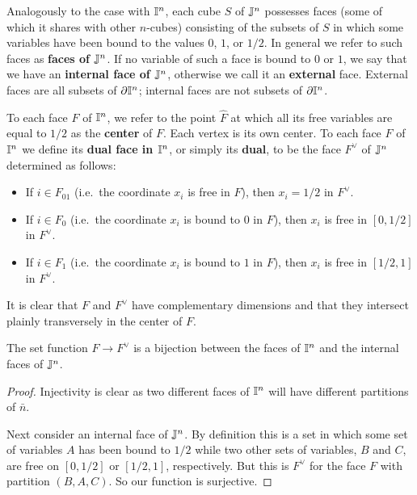 Analogously to the case with $\mathbb{I}^n$, each cube $S$ of $\mathbb{J}^n$ possesses faces (some of which it shares with other $n$-cubes) consisting of the subsets of $S$ in which some variables have been bound to the values $0$, $1$, or $1/2$. In general we refer to such faces as \textbf{faces of $\mathbb{J}^n$}. If no variable of such a face is bound to $0$ or $1$, we say that we have an \textbf{internal face of $\mathbb{J}^n$}, otherwise we call it an \textbf{external} face. External faces are all subsets of $\partial \mathbb{I}^n$; internal faces are not subsets of $\partial \mathbb{I}^n$.

To each face $F$ of $\mathbb{I}^n$, we refer to the point $\hat F$ at which all its free variables are equal to $1/2$ as the \textbf{center} of $F$. Each vertex is its own center. To each face $F$ of $\mathbb{I}^n$ we define its \textbf{dual face in $\mathbb{I}^n$}, or simply its \textbf{dual}, to be the face $F^\vee$ of $\mathbb{J}^n$ determined as follows:
\begin{itemize}
\item If $i \in F_{01}$ (i.e.\ the coordinate $x_i$ is free in $F$), then $x_i = 1/2$ in $F^\vee$.

\item If $i \in F_0$ (i.e.\ the coordinate $x_i$ is bound to $0$ in $F$), then $x_i$ is free in $[0,1/2]$ in $F^\vee$.

\item If $i \in F_1$ (i.e.\ the coordinate $x_i$ is bound to $1$ in $F$), then $x_i$ is free in $[1/2,1]$ in $F^\vee$.
\end{itemize}

It is clear that $F$ and $F^\vee$ have complementary dimensions and that they intersect plainly transversely in the center of $F$.

\begin{lemma}
The set function $F \to F^\vee$ is a bijection between the faces of $\mathbb{I}^n$ and the internal faces of $\mathbb{J}^n$.
\end{lemma}
\begin{proof}
Injectivity is clear as two different faces of $\mathbb{I}^n$ will have different partitions of $\bar n$.

Next consider an internal face of $\mathbb{J}^n$. By definition this is a set in which some set of variables $A$ has been bound to $1/2$ while two other sets of variables, $B$ and $C$, are free on $[0,1/2]$ or $[1/2,1]$, respectively. But this is $F^\vee$ for the face $F$ with partition $(B,A,C)$. So our function is surjective.
\end{proof}

